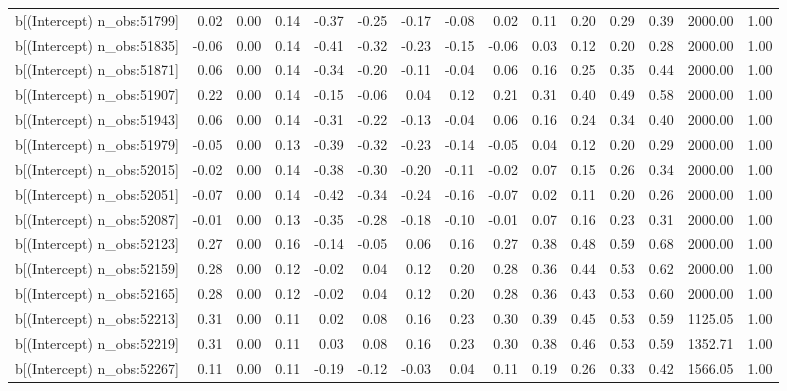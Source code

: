 \begin{table}[ht]
\begin{tabular}{rrrrrrrrrrrrrrr}
  b[(Intercept) n\_obs:51799] & 0.02 & 0.00 & 0.14 & -0.37 & -0.25 & -0.17 & -0.08 & 0.02 & 0.11 & 0.20 & 0.29 & 0.39 & 2000.00 & 1.00 \\ 
  b[(Intercept) n\_obs:51835] & -0.06 & 0.00 & 0.14 & -0.41 & -0.32 & -0.23 & -0.15 & -0.06 & 0.03 & 0.12 & 0.20 & 0.28 & 2000.00 & 1.00 \\ 
  b[(Intercept) n\_obs:51871] & 0.06 & 0.00 & 0.14 & -0.34 & -0.20 & -0.11 & -0.04 & 0.06 & 0.16 & 0.25 & 0.35 & 0.44 & 2000.00 & 1.00 \\ 
  b[(Intercept) n\_obs:51907] & 0.22 & 0.00 & 0.14 & -0.15 & -0.06 & 0.04 & 0.12 & 0.21 & 0.31 & 0.40 & 0.49 & 0.58 & 2000.00 & 1.00 \\ 
  b[(Intercept) n\_obs:51943] & 0.06 & 0.00 & 0.14 & -0.31 & -0.22 & -0.13 & -0.04 & 0.06 & 0.16 & 0.24 & 0.34 & 0.40 & 2000.00 & 1.00 \\ 
  b[(Intercept) n\_obs:51979] & -0.05 & 0.00 & 0.13 & -0.39 & -0.32 & -0.23 & -0.14 & -0.05 & 0.04 & 0.12 & 0.20 & 0.29 & 2000.00 & 1.00 \\ 
  b[(Intercept) n\_obs:52015] & -0.02 & 0.00 & 0.14 & -0.38 & -0.30 & -0.20 & -0.11 & -0.02 & 0.07 & 0.15 & 0.26 & 0.34 & 2000.00 & 1.00 \\ 
  b[(Intercept) n\_obs:52051] & -0.07 & 0.00 & 0.14 & -0.42 & -0.34 & -0.24 & -0.16 & -0.07 & 0.02 & 0.11 & 0.20 & 0.26 & 2000.00 & 1.00 \\ 
  b[(Intercept) n\_obs:52087] & -0.01 & 0.00 & 0.13 & -0.35 & -0.28 & -0.18 & -0.10 & -0.01 & 0.07 & 0.16 & 0.23 & 0.31 & 2000.00 & 1.00 \\ 
  b[(Intercept) n\_obs:52123] & 0.27 & 0.00 & 0.16 & -0.14 & -0.05 & 0.06 & 0.16 & 0.27 & 0.38 & 0.48 & 0.59 & 0.68 & 2000.00 & 1.00 \\ 
  b[(Intercept) n\_obs:52159] & 0.28 & 0.00 & 0.12 & -0.02 & 0.04 & 0.12 & 0.20 & 0.28 & 0.36 & 0.44 & 0.53 & 0.62 & 2000.00 & 1.00 \\ 
  b[(Intercept) n\_obs:52165] & 0.28 & 0.00 & 0.12 & -0.02 & 0.04 & 0.12 & 0.20 & 0.28 & 0.36 & 0.43 & 0.53 & 0.60 & 2000.00 & 1.00 \\ 
  b[(Intercept) n\_obs:52213] & 0.31 & 0.00 & 0.11 & 0.02 & 0.08 & 0.16 & 0.23 & 0.30 & 0.39 & 0.45 & 0.53 & 0.59 & 1125.05 & 1.00 \\ 
  b[(Intercept) n\_obs:52219] & 0.31 & 0.00 & 0.11 & 0.03 & 0.08 & 0.16 & 0.23 & 0.30 & 0.38 & 0.46 & 0.53 & 0.59 & 1352.71 & 1.00 \\ 
  b[(Intercept) n\_obs:52267] & 0.11 & 0.00 & 0.11 & -0.19 & -0.12 & -0.03 & 0.04 & 0.11 & 0.19 & 0.26 & 0.33 & 0.42 & 1566.05 & 1.00 \\ 

\end{tabular}
\end{table}
